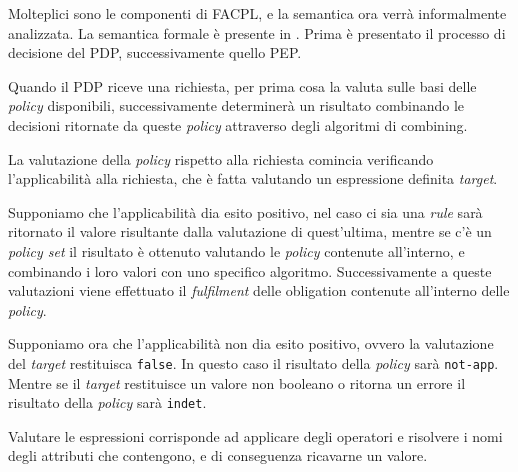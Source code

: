 Molteplici sono le componenti di FACPL, e la semantica ora verrà informalmente analizzata. La semantica formale è presente in \cite{fullfacpl}.
Prima è presentato il processo di decisione del \ac{PDP}, successivamente quello \ac{PEP}. \par
Quando il PDP riceve una richiesta, per prima cosa la valuta sulle basi delle \textit{policy} disponibili, successivamente determinerà un risultato combinando le decisioni ritornate da queste \textit{policy} attraverso degli algoritmi di combining. \par
La valutazione della \textit{policy} rispetto alla richiesta comincia verificando l'applicabilità alla richiesta, che è fatta valutando un espressione definita \textit{target}. \par
Supponiamo che l'applicabilità dia esito positivo, nel caso ci sia una \textit{rule} sarà ritornato il valore risultante dalla valutazione di quest'ultima, mentre se c'è un \textit{policy set} il risultato è ottenuto valutando le \textit{policy} contenute all'interno, e combinando i loro valori con uno specifico algoritmo. Successivamente a queste valutazioni viene effettuato il \textit{fulfilment} delle obligation contenute all'interno delle \textit{policy}. \par
Supponiamo ora che l'applicabilità non dia esito positivo, ovvero la valutazione del \textit{target} restituisca \texttt{false}. In questo caso il risultato della \textit{policy} sarà \texttt{not-app}. Mentre se il \textit{target} restituisce un valore non booleano o ritorna un errore il risultato della \textit{policy} sarà \texttt{indet}.

Valutare le espressioni corrisponde ad applicare degli operatori e risolvere i nomi degli attributi che contengono, e di conseguenza ricavarne un valore. \par

